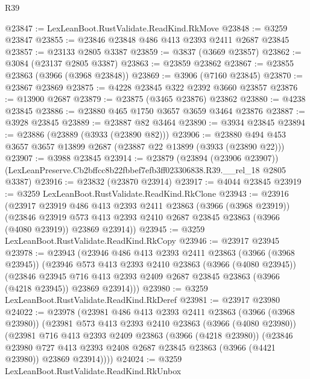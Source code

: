 \begin{lexlean}{R39}
\begin{coremodule}
@23847 := LexLeanBoot.RustValidate.ReadKind.RkMove
@23848 := @3259 @23847
@23855 := @23846 @23848 @486 @413 @2393 @2411 @2687 @23845
@23857 := @23133 @2805 @3387
@23859 := @3837 (@3669 @23857)
@23862 := @3084 (@23137 @2805 @3387)
@23863 := @23859 @23862
@23867 := @23855 @23863 (@3966 (@3968 @23848))
@23869 := @3906 (@7160 @23845)
@23870 := @23867 @23869
@23875 := @4228 @23845 @322 @2392 @3660 @23857
@23876 := @13900 @2687
@23879 := @23875 (@3465 @23876) @23862
@23880 := @4238 @23845
@23886 := @23880 @465 @1750 @3657 @3659 @3464 @23876
@23887 := @3928 @23845
@23889 := @23887 @82 @3464
@23890 := @3934 @23845
@23894 := @23886 (@23889 (@3933 (@23890 @82)))
@23906 := @23880 @494 @453 @3657 @3657 @13899 @2687 (@23887 @22 @13899 (@3933 (@23890 @22)))
@23907 := @3988 @23845
@23914 := @23879
    (@23894 (@23906 @23907))
    (LexLeanPreserve.Cb2bffcc8b22fbbef7efb3ff023306838.R39.__rel_18 @2805 @3387)
@23916 := @23832 (@23870 @23914)
@23917 := @4044 @23845
@23919 := @3259 LexLeanBoot.RustValidate.ReadKind.RkClone
@23943 := @23916
    (@23917
      @23919
      @486
      @413
      @2393
      @2411
      @23863
      (@3966 (@3968 @23919))
      (@23846
        @23919
        @573
        @413
        @2393
        @2410
        @2687
        @23845
        @23863
        (@3966 (@4080 @23919))
        @23869
        @23914))
@23945 := @3259 LexLeanBoot.RustValidate.ReadKind.RkCopy
@23946 := @23917 @23945
@23978 := @23943
    (@23946
      @486
      @413
      @2393
      @2411
      @23863
      (@3966 (@3968 @23945))
      (@23946
        @573
        @413
        @2393
        @2410
        @23863
        (@3966 (@4080 @23945))
        (@23846
          @23945
          @716
          @413
          @2393
          @2409
          @2687
          @23845
          @23863
          (@3966 (@4218 @23945))
          @23869
          @23914)))
@23980 := @3259 LexLeanBoot.RustValidate.ReadKind.RkDeref
@23981 := @23917 @23980
@24022 := @23978
    (@23981
      @486
      @413
      @2393
      @2411
      @23863
      (@3966 (@3968 @23980))
      (@23981
        @573
        @413
        @2393
        @2410
        @23863
        (@3966 (@4080 @23980))
        (@23981
          @716
          @413
          @2393
          @2409
          @23863
          (@3966 (@4218 @23980))
          (@23846
            @23980
            @727
            @413
            @2393
            @2408
            @2687
            @23845
            @23863
            (@3966 (@4421 @23980))
            @23869
            @23914))))
@24024 := @3259 LexLeanBoot.RustValidate.ReadKind.RkUnbox

\end{coremodule}
\end{lexlean}
